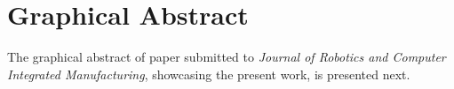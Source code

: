 
%

\chapter{Graphical Abstract}%
\label{ch:annex-article-graphical}
The graphical abstract of paper submitted to \emph{Journal of Robotics and Computer Integrated
  Manufacturing}, showcasing the present work, is presented next.


